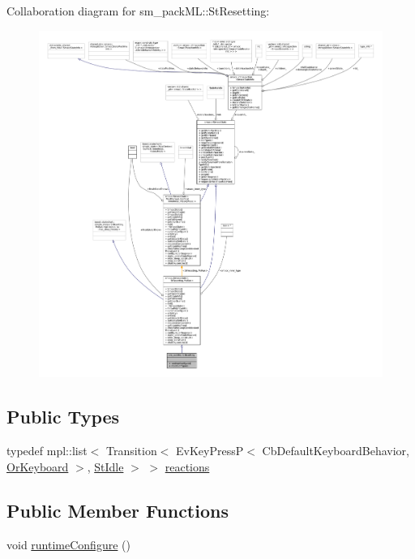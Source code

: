 Collaboration diagram for sm\+\_\+pack\+ML\+:\+:St\+Resetting\+:
\nopagebreak
\begin{figure}[H]
\begin{center}
\leavevmode
\includegraphics[width=350pt]{structsm__packML_1_1StResetting__coll__graph}
\end{center}
\end{figure}
\subsection*{Public Types}
\begin{DoxyCompactItemize}
\item 
typedef mpl\+::list$<$ Transition$<$ Ev\+Key\+PressP$<$ Cb\+Default\+Keyboard\+Behavior, \hyperlink{classsm__packML_1_1OrKeyboard}{Or\+Keyboard} $>$, \hyperlink{structsm__packML_1_1StIdle}{St\+Idle} $>$ $>$ \hyperlink{structsm__packML_1_1StResetting_a757c61e9580be9f47758c7e58f08a135}{reactions}
\end{DoxyCompactItemize}
\subsection*{Public Member Functions}
\begin{DoxyCompactItemize}
\item 
void \hyperlink{structsm__packML_1_1StResetting_a994a59cfdc6092d4a2652479305f7227}{runtime\+Configure} ()
\end{DoxyCompactItemize}
